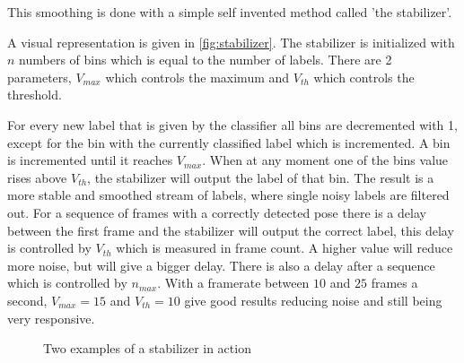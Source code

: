 This smoothing is done with a simple self invented method called 'the stabilizer'.

A visual representation is given in \autoref{fig:stabilizer}. The stabilizer is initialized with $n$ numbers of bins which is equal to the number of labels. There are 2 parameters, $V_{max}$ which controls the maximum and $V_{th}$ which controls the threshold.

For every new label that is given by the classifier all bins are decremented with 1, except for the bin with the currently classified label which is incremented. A bin is incremented until it reaches $V_{max}$. When at any moment one of the bins value rises above $V_{th}$, the stabilizer will output the label of that bin. The result is a more stable and smoothed stream of labels, where single noisy labels are filtered out. For a sequence of frames with a correctly detected pose there is a delay between the first frame and the stabilizer will output the correct label, this delay is controlled by $V_{th}$ which is measured in frame count. A higher value will reduce more noise, but will give a bigger delay. There is also a delay after a sequence which is controlled by $n_{max}$. With a framerate between $10$ and $25$ frames a second, $V_{max} = 15$ and $V_{th} = 10$ give good results reducing noise and still being very responsive.

\begin{figure}[htbp]
  \centering
{}
\hspace{0.03\linewidth}
  \caption{Two examples of a stabilizer in action}
  \label{fig:stabilizer}
\end{figure}

